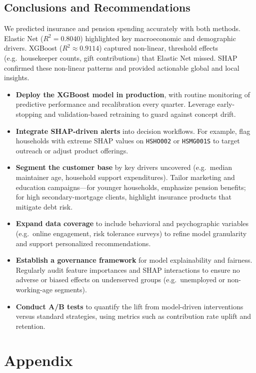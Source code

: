 \documentclass{article}
\begin{document}
\subsection*{Conclusions and Recommendations}

We predicted insurance and pension spending accurately with both methods. Elastic Net ($R^2=0.8040$) highlighted key macroeconomic and demographic drivers. XGBoost ($R^2\approx0.9114$) captured non-linear, threshold effects (e.g.\ housekeeper counts, gift contributions) that Elastic Net missed. SHAP confirmed these non-linear patterns and provided actionable global and local insights.

\begin{itemize}
  \item \textbf{Deploy the XGBoost model in production}, with routine monitoring of predictive performance and recalibration every quarter. Leverage early-stopping and validation-based retraining to guard against concept drift.
  \item \textbf{Integrate SHAP-driven alerts} into decision workflows. For example, flag households with extreme SHAP values on \texttt{HSHO002} or \texttt{HSMG001S} to target outreach or adjust product offerings.
  \item \textbf{Segment the customer base} by key drivers uncovered (e.g.\ median maintainer age, household support expenditures). Tailor marketing and education campaigns—for younger households, emphasize pension benefits; for high secondary-mortgage clients, highlight insurance products that mitigate debt risk.
  \item \textbf{Expand data coverage} to include behavioral and psychographic variables (e.g.\ online engagement, risk tolerance surveys) to refine model granularity and support personalized recommendations.
  \item \textbf{Establish a governance framework} for model explainability and fairness. Regularly audit feature importances and SHAP interactions to ensure no adverse or biased effects on underserved groups (e.g.\ unemployed or non-working-age segments).
  \item \textbf{Conduct A/B tests} to quantify the lift from model-driven interventions versus standard strategies, using metrics such as contribution rate uplift and retention.
\end{itemize}

\appendix
\section*{Appendix}
\end{document}
